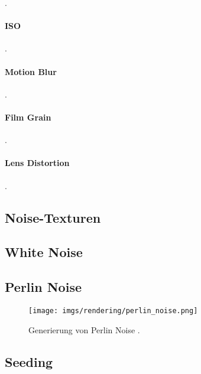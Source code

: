 .

\paragraph{ISO}

.

\paragraph{Motion Blur}

.

\paragraph{Film Grain}

.

\paragraph{Lens Distortion}

.



\subsection{Noise-Texturen}
\label{sec:noise}

\subsection{White Noise}

\cite{white_noise}

\subsection{Perlin Noise}


\cite{perlin_noise_original,perlin_noise_extension}



\begin{figure}
    \centering
    \texttt{[image: imgs/rendering/perlin\_noise.png]}
    \caption{Generierung von Perlin Noise \cite{perlin_noise_img}.}
    \label{img:perlin_noise_generation}
\end{figure}

\subsection{Seeding}

